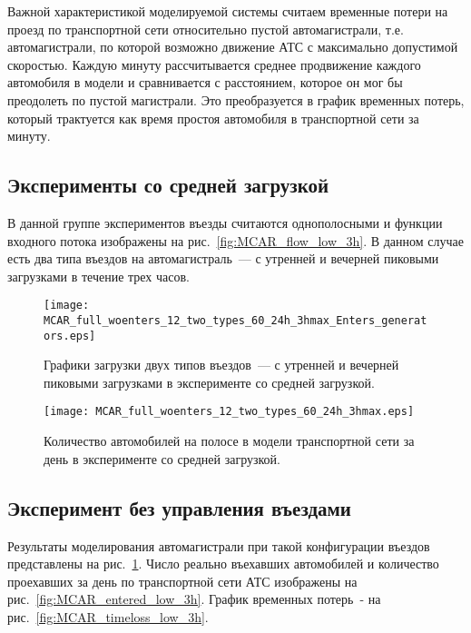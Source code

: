 Важной характеристикой моделируемой системы считаем временные потери на проезд по транспортной сети относительно пустой автомагистрали, т.е. автомагистрали, по которой возможно движение АТС с максимально допустимой скоростью.
Каждую минуту рассчитывается среднее продвижение каждого автомобиля в модели и сравнивается с расстоянием, которое он мог бы преодолеть по пустой магистрали.
Это преобразуется в график временных потерь, который трактуется как время простоя автомобиля в транспортной сети за минуту.

\subsection{Эксперименты со средней загрузкой}
В данной группе экспериментов въезды считаются однополосными и функции входного потока изображены на рис.~\ref{fig:MCAR_flow_low_3h}.
В данном случае есть два типа въездов на автомагистраль~--- с утренней и вечерней пиковыми загрузками в течение трех часов.
\begin{figure}[ht]
    \begin{minipage}[b][][b]{0.49\textwidth}
        \centering
        \texttt{[image: MCAR\_full\_woenters\_12\_two\_types\_60\_24h\_3hmax\_Enters\_generators.eps]}
        \caption{Графики загрузки двух типов въездов~--- с утренней и вечерней пиковыми загрузками в эксперименте со средней загрузкой.}
        \label{fig:MCAR_flow_low_3h}
    \end{minipage}
    \hfill
    \begin{minipage}[b][][b]{0.49\textwidth}
        \centering
        \texttt{[image: MCAR\_full\_woenters\_12\_two\_types\_60\_24h\_3hmax.eps]}
        \caption{Количество автомобилей на полосе в модели транспортной сети за день в эксперименте со средней загрузкой.}
        \label{fig:MCAR_heatmap_low_3h}
    \end{minipage}
\end{figure}

\subsection{Эксперимент без управления въездами}
Результаты моделирования автомагистрали при такой конфигурации въездов представлены на рис.~\ref{fig:MCAR_heatmap_low_3h}.
Число реально въехавших автомобилей и количество проехавших за день по транспортной сети АТС изображены на рис.~\ref{fig:MCAR_entered_low_3h}.
График временных потерь~- на рис.~\ref{fig:MCAR_timeloss_low_3h}.

